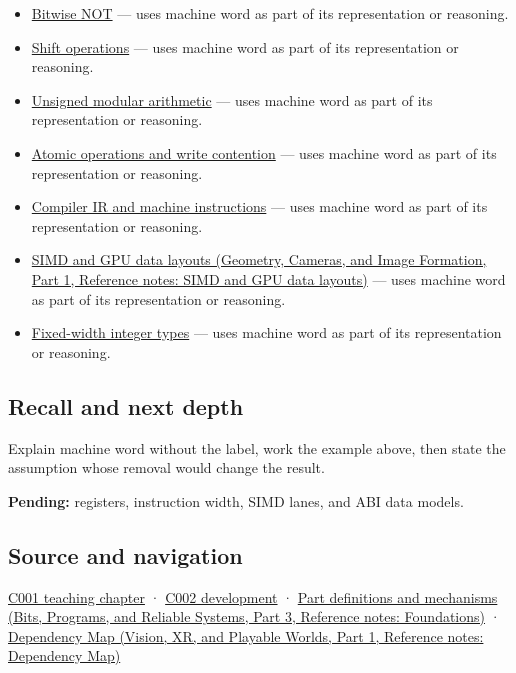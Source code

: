 \begin{itemize}
\tightlist
\item
  \hyperref[appendix-8f38927cfc54]{Bitwise NOT} --- uses machine word as part of its representation or reasoning.
\item
  \hyperref[appendix-73425b25118e]{Shift operations} --- uses machine word as part of its representation or reasoning.
\item
  \hyperref[appendix-c99977d88b33]{Unsigned modular arithmetic} --- uses machine word as part of its representation or reasoning.
\item
  \hyperref[appendix-e12d1b03fefb]{Atomic operations and write contention} --- uses machine word as part of its representation or reasoning.
\item
  \hyperref[appendix-942ad41afb30]{Compiler IR and machine instructions} --- uses machine word as part of its representation or reasoning.
\item
  \href{../03-Geometry-Cameras-and-Image-Formation-P01/main.pdf\#appendix-3c7b1a56de01}{SIMD and GPU data layouts (Geometry, Cameras, and Image Formation, Part 1, Reference notes: SIMD and GPU data layouts)} --- uses machine word as part of its representation or reasoning.
\item
  \hyperref[appendix-cc04044b5782]{Fixed-width integer types} --- uses machine word as part of its representation or reasoning.
\end{itemize}

\subsection{Recall and next depth}\label{appendix-d67a19507dc5-recall-and-next-depth}

\hypertarget{appendix-d67a19507dc5-recall-and-next-depth}{}

Explain machine word without the label, work the example above, then state the assumption whose removal would change the result.

\textbf{Pending:} registers, instruction width, SIMD lanes, and ABI data models.

\subsection{Source and navigation}\label{appendix-d67a19507dc5-source-and-navigation}

\hypertarget{appendix-d67a19507dc5-source-and-navigation}{}

\hyperref[01-foundations-i-ch001-from-a-signal-to-an-interpretation]{C001 teaching chapter} · \hyperref[01-foundations-i-ch001-arithmetic-becomes-a-policy]{C002 development} · \href{../01-Bits-Programs-and-Reliable-Systems-P03/main.pdf\#appendix-fd090d982a15}{Part definitions and mechanisms (Bits, Programs, and Reliable Systems, Part 3, Reference notes: Foundations)} · \href{../07-Vision-XR-and-Playable-Worlds-P01/main.pdf\#appendix-4ad47bdd269a}{Dependency Map (Vision, XR, and Playable Worlds, Part 1, Reference notes: Dependency Map)}
